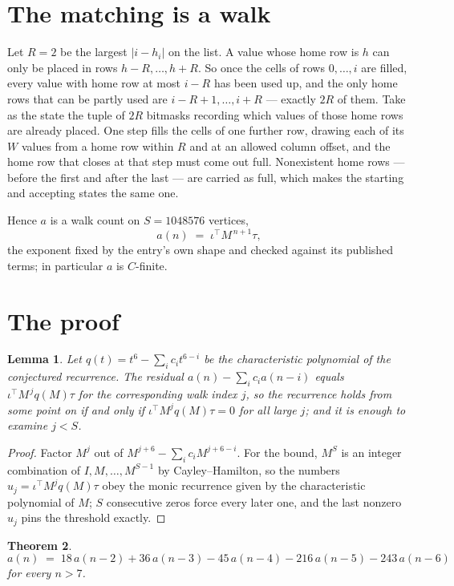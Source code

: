 \documentclass[11pt,a4paper]{article}
\theoremstyle{plain}
\newtheorem{theorem}{Theorem}
\newtheorem{lemma}[theorem]{Lemma}
\theoremstyle{definition}
\begin{document}
\section{The matching is a walk}

Let $R=2$ be the largest $|i-h_i|$ on the list. A value whose home row is $h$ can only be
placed in rows $h-R,\dots,h+R$. So once the cells of rows $0,\dots,i$ are filled, every
value with home row at most $i-R$ has been used up, and the only home rows that can be
partly used are $i-R+1,\dots,i+R$ --- exactly $2R$ of them. Take as the state the tuple of
$2R$ bitmasks recording which values of those home rows are already placed. One step fills
the cells of one further row, drawing each of its $W$ values from a home row within $R$
and at an allowed column offset, and the home row that closes at that step must come out
full. Nonexistent home rows --- before the first and after the last --- are carried as
full, which makes the starting and accepting states the same one.

Hence $a$ is a walk count on $S=1048576$ vertices,
\[
a(n)\;=\;\iota^{\!\top}M^{\,n+1}\tau ,
\]
the exponent fixed by the entry's own shape and checked against its published terms; in
particular $a$ is $C$-finite.

\section{The proof}

\begin{lemma}\label{lem:crit}
Let $q(t)=t^{6}-\sum_i c_it^{6-i}$ be the characteristic polynomial of the
conjectured recurrence. The residual $a(n)-\sum_ic_ia(n-i)$ equals
$\iota^{\!\top}M^{\,j}q(M)\tau$ for the corresponding walk index $j$, so the recurrence
holds from some point on if and only if $\iota^{\!\top}M^{j}q(M)\tau=0$ for all large $j$;
and it is enough to examine $j<S$.
\end{lemma}

\begin{proof}
Factor $M^{j}$ out of $M^{j+6}-\sum_ic_iM^{j+6-i}$. For the bound, $M^{S}$
is an integer combination of $I,M,\dots,M^{S-1}$ by Cayley--Hamilton, so the numbers
$u_j=\iota^{\!\top}M^{j}q(M)\tau$ obey the monic recurrence given by the characteristic
polynomial of $M$; $S$ consecutive zeros force every later one, and the last nonzero $u_j$
pins the threshold exactly.
\end{proof}

\begin{theorem}
\[
a(n)\;=\;18\,a(n-2) + 36\,a(n-3) - 45\,a(n-4) - 216\,a(n-5) - 243\,a(n-6)
\]
for every $n>7$.
\end{theorem}
\end{document}
